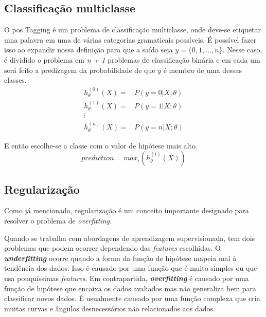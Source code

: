 \subsection{Classificação multiclasse}

O \ac{pos} Tagging é um problema de classificação multiclasse, onde deve-se etiquetar uma palavra em uma de várias categorias gramaticais possíveis. É possível fazer isso ao expandir nossa definição para que a saída seja $y = \{0, 1, ..., n\}$. Nesse caso, é dividido o problema em \textit{n + 1} problemas de classificação binária e em cada um será feito a predizagem da probabilidade de que $y$ é membro de uma dessas classes.
\begin{align}
h_{\theta}^{(0)}(X) =&  P(y=0 | X ; \theta) \nonumber \\
h_{\theta}^{(1)}(X) =&  P(y=1 | X ; \theta) \nonumber \\
\vdots & \nonumber \\
h_{\theta}^{(n)}(X) =&  P(y=n | X ; \theta) \nonumber
\end{align}

E então escolhe-se a classe com o valor de hipótese mais alto.
\begin{equation}
prediction = max_i(h_{\theta}^{(i)}(X)) \nonumber
\end{equation}


\subsection{Regularização}\label{subsec:regularizacao}

Como já mencionado, regularização é um conceito importante designado para resolver o problema de \textit{overfitting}.

Quando se trabalha com abordagens de aprendizagem supervisionada, tem dois problemas que podem ocorrer dependendo das \textit{features} escolhidas. O \textbf{\textit{underfitting}} ocorre quando a forma da função de hipótese mapeia mal à tendência dos dados. Isso é causado por uma função que é muito simples ou que usa pouquíssimas \textit{features}. Em contrapartida, \textbf{\textit{overfitting}} é causado por uma função de hipótese que encaixa os dados avaliados mas não generaliza bem para classificar novos dados. É usualmente causado por uma função complexa que cria muitas curvas e ângulos desnecessários não relacionados aos dados.

